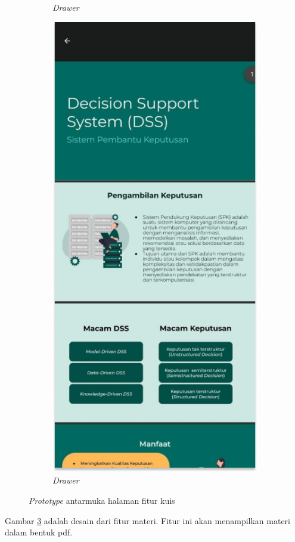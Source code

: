 \begin{figure}[H]
\begin{subfigure}[b]{0.23\textwidth}
	  \caption{\textit{Drawer}}
	  \label{fig:HasilMain4-dark}
	\end{subfigure}
    \begin{subfigure}[b]{0.23\textwidth}
		\centering
	  \includegraphics[width=\linewidth]{contents/chapter-3/images/HF-materi2-dt.png}
	  \caption{\textit{Drawer}}
	  \label{fig:HasilMain4}
	\end{subfigure}
	\caption{\textit{Prototype} antarmuka halaman fitur kuis}
	\label{Fig:HasilFeatureSetDrawer}
\end{figure}
Gambar \ref*{Fig:HasilFeatureSetDrawer} adalah desain dari fitur materi. Fitur ini akan menampilkan materi dalam bentuk pdf.
